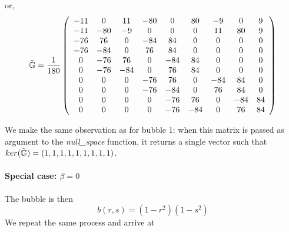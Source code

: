 or,
\[
\tilde{{\mathbb{G}}}
=
\frac{1}{180}
\left(
\begin{array}{ccccccccc}
-11  &   0 &  11 & -80 &   0 &   80 &  -9 &   0 &   9 \\ 
-11  & -80 &  -9 &   0 &   0 &    0 &  11 &  80 &   9 \\ 
-76  &  76 &   0 & -84 &  84 &    0 &   0 &   0 &   0 \\ 
-76  & -84 &   0 &  76 &  84 &    0 &   0 &   0 &   0 \\ 
  0  & -76 &  76 &   0 & -84 &   84 &   0 &   0 &   0 \\ 
  0  & -76 & -84 &   0 &  76 &   84 &   0 &   0 &   0 \\ 
  0  &   0 &   0 & -76 &  76 &    0 & -84 &  84 &   0 \\ 
  0  &   0 &   0 & -76 & -84 &    0 &  76 &  84 &   0 \\ 
  0  &   0 &   0 &   0 & -76 &   76 &   0 & -84 &  84 \\ 
  0  &   0 &   0 &   0 & -76 &  -84 &   0 &  76 &  84 
\end{array}
\right)
\]

We make the same observation as for bubble 1: 
when this matrix is passed as argument to the {\sl null\_space} function, 
it returns a single vector such that $ker(\tilde{{\mathbb{G}}})=(1,1,1,1,1,1,1,1,1)$.


\paragraph{Special case: $\beta=0$} The bubble is then 
\[
b(r,s)=(1-r^2)(1-s^2)
\]
We repeat the same process and arrive at

